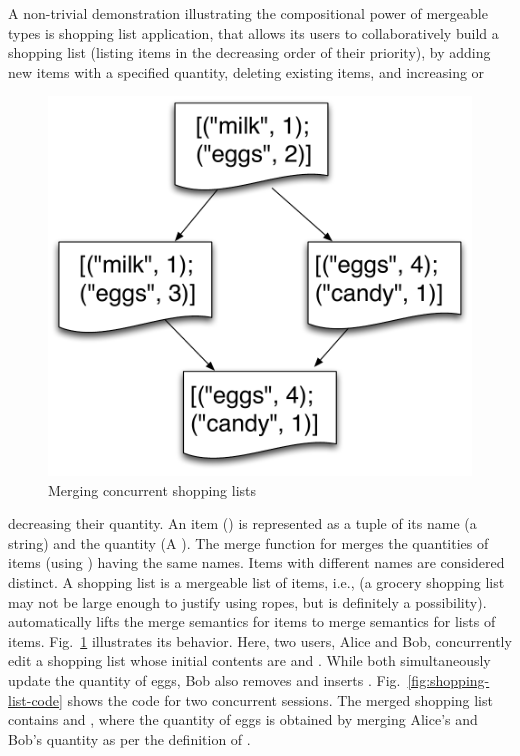 A non-trivial demonstration illustrating the compositional power of
mergeable types is shopping list application, that allows its users to
collaboratively build a shopping list (listing items in the decreasing
order of their priority), by adding new items with a
specified quantity, deleting existing items, and increasing or
\begin{figure}
  \centering
  \includegraphics[scale=0.3]{Figures/shopping-list}
  \caption{Merging concurrent shopping lists}
  \label{fig:shopping-list}
  \vspace*{-.2in}
\end{figure}
decreasing their quantity. An item () is represented as a
tuple of its name (a string) and the quantity (A ). The merge
function for  merges the quantities of items (using
) having the same names. Items with different names are
considered distinct. A shopping list is a mergeable list of items,
i.e.,  (a grocery shopping list may not be large enough
to justify using ropes, but  is definitely a
possibility).   automatically lifts the merge
semantics for items to merge semantics for lists of items.
Fig.~\ref{fig:shopping-list} illustrates its behavior.  Here, two
users, Alice and Bob, concurrently edit a shopping list whose initial
contents are  and . While both simultaneously update
the quantity of eggs, Bob also removes  and inserts .
Fig.~\ref{fig:shopping-list-code} shows the \name code for two
concurrent sessions. The merged shopping list contains  and
, where the quantity of eggs is obtained by merging Alice's
and Bob's quantity as per the definition of .


